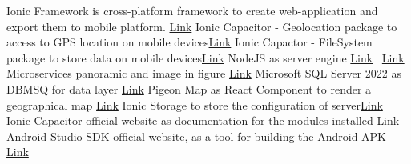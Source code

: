 \documentclass[conference]{IEEEtran}
\begin{document}
\begin{thebibliography}{00}
 Ionic Framework is cross-platform framework to create web-application and export them to mobile platform. \href{http://www.overleaf.com}{Link}
 Ionic Capacitor - Geolocation package to access to GPS location on mobile devices\href{https://capacitorjs.com/docs/apis/geolocation}{Link}
Ionic Capactor - FileSystem package to store data on mobile devices\href{https://capacitorjs.com/docs/apis/filesystem}{Link}
 NodeJS as server engine \href{https://nodejs.org/en}{Link}\
 \href{https://tediousjs.github.io/tedious/}{Link}
\bibitem{b6} Microservices panoramic and image in figure \href{https://medium.com/the-modern-scientist/introduction-to-microservices-architecture-f0c7eefe79f1}{Link}
\bibitem{b7} Microsoft SQL Server 2022 as DBMSQ for data layer \href{https://www.microsoft.com/en-us/sql-server/sql-server-2022}{Link}
\bibitem{b8} Pigeon Map as React Component to render a geographical map \href{https://pigeon-maps.js.org/}{Link}
\bibitem[b9]Ionic Storage to store the configuration of server\href{https://ionicframework.com/docs/react/storage}{Link}
\bibitem[b10]Ionic Capacitor official website as documentation for the modules installed \href{https://capacitorjs.com/}{Link}
\bibitem[b11]Android Studio SDK official website, as a tool for building the Android APK \href{https://developer.android.com/studio}{Link}

\end{thebibliography}
\vspace{12pt}
\end{document}
